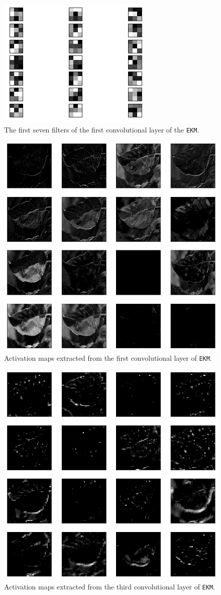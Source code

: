 \documentclass[aps,twocolumn,secnumarabic,nobalancelastpage,amsmath,amssymb,
nofootinbib]{revtex4}
\begin{document}
\begin{figure}[h!]
	\centering
	\includegraphics[width=0.65\linewidth]{Images/FiltersEKM}
	\caption{The first seven filters of the first convolutional layer of the \texttt{EKM}.}
	\label{fig:filtersekm}
\end{figure}
\begin{figure}[h!]
	\centering
	\includegraphics[width=0.65\linewidth]{Images/FeatureMaps0}
	
	\caption{Activation maps extracted from the first convolutional layer of \texttt{EKM}.}
	\label{fig:fm9}
\end{figure}
\begin{figure}[h!]
	\centering
	\includegraphics[width=0.65\linewidth]{Images/FeatureMaps4}
	
	\caption{Activation maps extracted from the third convolutional layer of \texttt{EKM}.}
	\label{fig:fm6}
\end{figure}
\end{document}
